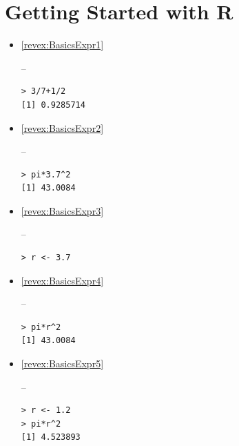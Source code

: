 \documentclass[10pt,openany]{book}\usepackage[]{graphicx}\usepackage[]{color}
\makeatletter
\newenvironment{kframe}{%
 \def\at@end@of@kframe{}%
 \ifinner\ifhmode%
  \def\at@end@of@kframe{\end{minipage}}%
  \begin{minipage}{\columnwidth}%
 \fi\fi%
 \def\FrameCommand##1{\hskip\@totalleftmargin \hskip-\fboxsep
 \colorbox{shadecolor}{##1}\hskip-\fboxsep
     \hskip-\linewidth \hskip-\@totalleftmargin \hskip\columnwidth}%
 \MakeFramed {\advance\hsize-\width
   \@totalleftmargin\z@ \linewidth\hsize
   \@setminipage}}%
 {\par\unskip\endMakeFramed%
 \at@end@of@kframe}
\newenvironment{knitrout}{}{} %
\makeatother
\begin{document}
\section*{Getting Started with R}
\begin{itemize}
  \item \hypertarget{ans:BasicsExpr1}{\ref{revex:BasicsExpr1}} --
\begin{knitrout}
\color{fgcolor}\begin{kframe}
\begin{verbatim}
> 3/7+1/2
[1] 0.9285714
\end{verbatim}
\end{kframe}
\end{knitrout}
  \item \hypertarget{ans:BasicsExpr2}{\ref{revex:BasicsExpr2}} --
\begin{knitrout}
\color{fgcolor}\begin{kframe}
\begin{verbatim}
> pi*3.7^2
[1] 43.0084
\end{verbatim}
\end{kframe}
\end{knitrout}
  \item \hypertarget{ans:BasicsExpr3}{\ref{revex:BasicsExpr3}} --
\begin{knitrout}
\color{fgcolor}\begin{kframe}
\begin{verbatim}
> r <- 3.7
\end{verbatim}
\end{kframe}
\end{knitrout}
  \item \hypertarget{ans:BasicsExpr4}{\ref{revex:BasicsExpr4}} --
\begin{knitrout}
\color{fgcolor}\begin{kframe}
\begin{verbatim}
> pi*r^2
[1] 43.0084
\end{verbatim}
\end{kframe}
\end{knitrout}
  \item \hypertarget{ans:BasicsExpr5}{\ref{revex:BasicsExpr5}} --
\begin{knitrout}
\color{fgcolor}\begin{kframe}
\begin{verbatim}
> r <- 1.2
> pi*r^2
[1] 4.523893
\end{verbatim}
\end{kframe}
\end{knitrout}


\end{itemize}
\end{document}
